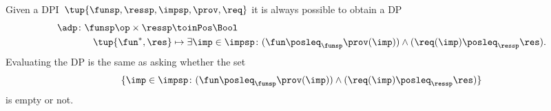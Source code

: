 Given a DPI~$\tup{\funsp, \ressp, \impsp, \prov,\req}$ it is always possible to obtain a DP
\begin{equation}
   \label{eq:dpi_to_dp_1}
\begin{aligned}
  \adp\colon \funsp\op \times \ressp &\toinPos \Bool\\
  \tup{\fun^*,\res}&\mapsto \exists \imp \in \impsp \colon (\fun \posleq_\funsp \prov(\imp)) \wedge (\req(\imp)\posleq_\ressp \res).
\end{aligned}
\end{equation}
Evaluating the DP is the same as asking whether the set
\begin{equation}
  \label{eq:dpi_to_dp_2}
\{ \imp \in \impsp \colon (\fun \posleq_\funsp \prov(\imp)) \wedge (\req(\imp)\posleq_\ressp \res)\}
\end{equation}
is empty or not.


